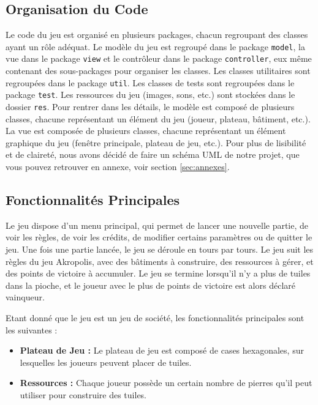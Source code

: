 \documentclass{article}
\begin{document}
    \subsection{Organisation du Code}\label{subsec:organisation-du-code}

    Le code du jeu est organisé en plusieurs packages, chacun regroupant des classes ayant un rôle adéquat.
    Le modèle du jeu est regroupé dans le package \texttt{model}, la vue dans le package \texttt{view} et le contrôleur dans le package \texttt{controller}, eux même contenant des sous-packages pour organiser les classes.
    Les classes utilitaires sont regroupées dans le package \texttt{util}.
    Les classes de tests sont regroupées dans le package \texttt{test}.
    Les ressources du jeu (images, sons, etc.) sont stockées dans le dossier \texttt{res}.
    Pour rentrer dans les détails, le modèle est composé de plusieurs classes, chacune représentant un élément du jeu (joueur, plateau, bâtiment, etc.).
    La vue est composée de plusieurs classes, chacune représentant un élément graphique du jeu (fenêtre principale, plateau de jeu, etc.).
    Pour plus de lisibilité et de claireté, nous avons décidé de faire un schéma UML de notre projet, que vous pouvez retrouver en annexe, voir section \ref{sec:annexes}.

    \subsection{Fonctionnalités Principales}\label{subsec:fonctionnalites-principales}

    Le jeu dispose d'un menu principal, qui permet de lancer une nouvelle partie, de voir les règles, de voir les crédits, de modifier certains paramètres ou de quitter le jeu.
    Une fois une partie lancée, le jeu se déroule en tours par tours.
    Le jeu suit les règles du jeu Akropolis, avec des bâtiments à construire, des ressources à gérer, et des points de victoire à accumuler.
    Le jeu se termine lorsqu'il n'y a plus de tuiles dans la pioche, et le joueur avec le plus de points de victoire est alors déclaré vainqueur.

    Etant donné que le jeu est un jeu de société, les fonctionnalités principales sont les suivantes :
    \begin{itemize}
        \item \textbf{Plateau de Jeu :} Le plateau de jeu est composé de cases hexagonales, sur lesquelles les joueurs peuvent placer de tuiles.
        \item \textbf{Ressources :} Chaque joueur possède un certain nombre de pierres qu'il peut utiliser pour construire des tuiles. \end{itemize}
\end{document}

